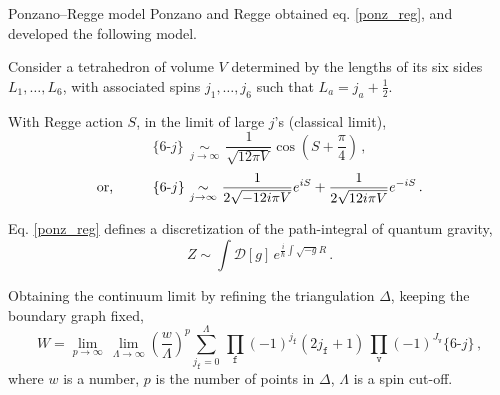 \documentclass{beamer}
\DeclareMathOperator*{\opsim}{\,\sim\,}
\begin{document}
\begin{frame}{Ponzano–Regge model}
    Ponzano and Regge obtained eq. \ref{ponz_reg}, and developed the following model.
    \begin{list}{\maltese}{\leftmargin=1em \itemindent=0em}
        \item<1-> Consider a tetrahedron of volume $V$ determined by the lengths of its six sides $L_1,\dots,L_6$, with associated spins $j_1,\dots,j_6$ such that $L_a=j_a+\frac{1}{2}$.
        \item<2-> With Regge action $S$, in the limit of large $j$'s (classical limit),\vspace{-3pt}
        \begin{equation}
            \{6\text{-}j\}\,\opsim\limits_{j\to\infty}\,\frac{1}{\sqrt{12\pi V}}\cos{\left(S+\frac{\pi}{4}\right)}\,,
        \end{equation}
        \begin{equation}
            \text{or,\,\,\,\,\,\,\,\,\,\,\,\,\,\,\,\,\,}\{6\text{-}j\}\,\opsim\limits_{j\to\infty}\,\frac{1}{2\sqrt{-12i\pi V}}e^{iS}+\frac{1}{2\sqrt{12i\pi V}}e^{-iS}\,.
        \end{equation}
        \item<3-> Eq. \ref{ponz_reg} defines a discretization of the path-integral of quantum gravity,\vspace{-3pt}
        \begin{equation}
            Z\sim\int\mathcal{D}[g]\,e^{\frac{i}{\hbar}\int\sqrt{-g}R}\,.
        \end{equation}
        \item<4-> Obtaining the continuum limit by refining the triangulation $\Delta$, keeping the boundary graph fixed,\vspace{-4pt}
        \begin{equation}
            W=\lim_{p\to\infty}\,\lim_{\Lambda\to\infty}\left(\frac{w}{\Lambda}\right)^p\sum_{j_\mathtt{f}=0}^\Lambda\,\prod_\mathtt{f}(-1)^{j_\mathtt{f}}(2j_\mathtt{f}+1)\,\prod_\mathtt{v}(-1)^{J_\mathtt{v}}\{6\text{-}j\}\,,
        \end{equation}
        where $w$ is a number, $p$ is the number of points in $\Delta$, $\Lambda$ is a spin cut-off.
    \end{list}
\end{frame}
\end{document}
